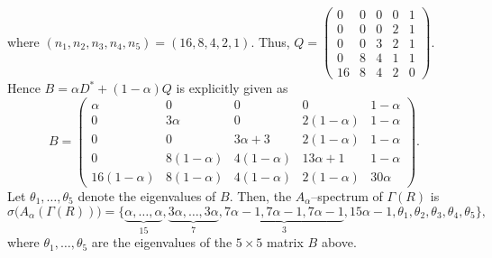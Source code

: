 \documentclass[12pt,twoside]{article}
\begin{document}
	where $(n_1,n_2,n_3,n_4,n_5) = (16,8,4,2,1)$. Thus, $Q =
	\begin{pmatrix}
		0 & 0 & 0 & 0 & 1\\
		0 & 0 & 0 & 2 & 1\\
		0 & 0 & 3 & 2 & 1\\
		0 & 8 & 4 & 1 & 1\\
		16 & 8 & 4 & 2 & 0
	\end{pmatrix}.$
	Hence $B = \alpha D^\ast + (1-\alpha)Q$	is explicitly given as
	\[
	B =
	\begin{pmatrix}
		\alpha & 0 & 0 & 0 & 1-\alpha\\[3pt]
		0 & 3\alpha & 0 & 2(1-\alpha) & 1-\alpha\\[3pt]
		0 & 0 & 3\alpha+3 & 2(1-\alpha) & 1-\alpha\\[3pt]
		0 & 8(1-\alpha) & 4(1-\alpha) & 13\alpha+1 & 1-\alpha\\[3pt]
		16(1-\alpha) & 8(1-\alpha) & 4(1-\alpha) & 2(1-\alpha) & 30\alpha
	\end{pmatrix}.
	\]
	Let $\theta_1,\dots,\theta_5$ denote the eigenvalues of $B$.  Then, the $A_\alpha$--spectrum of $ \varGamma(R)$  is
	\[
	\sigma\bigl(A_\alpha( \varGamma(R))\bigr)
	=
	\bigl\{
	\underbrace{\alpha,\dots,\alpha}_{15},
	\underbrace{3\alpha,\dots,3\alpha}_{7},
	\underbrace{7\alpha-1,7\alpha-1,7\alpha-1}_{3},
	15\alpha-1,
	\theta_1,\theta_2,\theta_3,\theta_4,\theta_5
	\bigr\},
	\]
	where $\theta_1,\dots,\theta_5$ are the eigenvalues of the $5\times5$
	matrix $B$ above.
\end{document}
